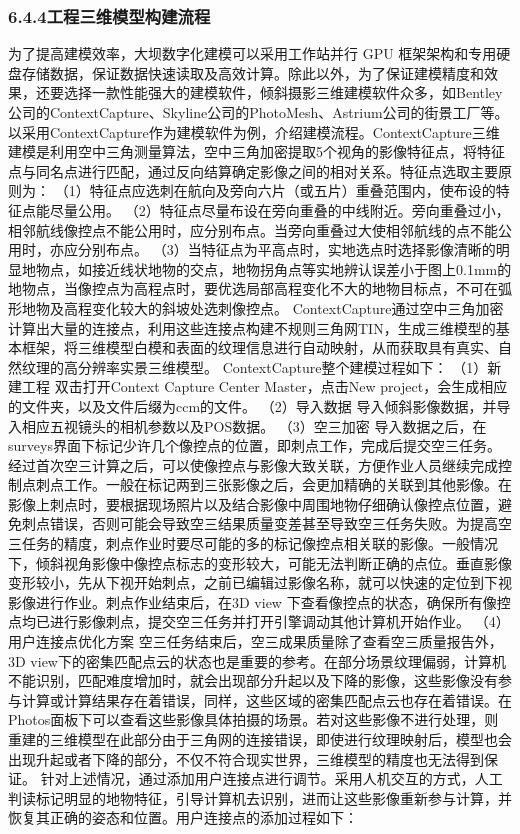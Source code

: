 \subsubsection{6.4.4工程三维模型构建流程}\label{ux5de5ux7a0bux4e09ux7ef4ux6a21ux578bux6784ux5efaux6d41ux7a0b} 为了提高建模效率，大坝数字化建模可以采用工作站并行 GPU 框架架构和专用硬盘存储数据，保证数据快速读取及高效计算。除此以外，为了保证建模精度和效果，还要选择一款性能强大的建模软件，倾斜摄影三维建模软件众多，如Bentley公司的ContextCapture、Skyline公司的PhotoMesh、Astrium公司的街景工厂等。 以采用ContextCapture作为建模软件为例，介绍建模流程。ContextCapture三维建模是利用空中三角测量算法，空中三角加密提取5个视角的影像特征点，将特征点与同名点进行匹配，通过反向结算确定影像之间的相对关系。特征点选取主要原则为： （1）特征点应选刺在航向及旁向六片（或五片）重叠范围内，使布设的特征点能尽量公用。 （2）特征点尽量布设在旁向重叠的中线附近。旁向重叠过小，相邻航线像控点不能公用时，应分别布点。当旁向重叠过大使相邻航线的点不能公用时，亦应分别布点。 （3）当特征点为平高点时，实地选点时选择影像清晰的明显地物点，如接近线状地物的交点，地物拐角点等实地辨认误差小于图上0.1mm的地物点，当像控点为高程点时，要优选局部高程变化不大的地物目标点，不可在弧形地物及高程变化较大的斜坡处选刺像控点。 ContextCapture通过空中三角加密计算出大量的连接点，利用这些连接点构建不规则三角网TIN，生成三维模型的基本框架，将三维模型白模和表面的纹理信息进行自动映射，从而获取具有真实、自然纹理的高分辨率实景三维模型。 ContextCapture整个建模过程如下： （1）新建工程 双击打开Context Capture Center Master，点击New project，会生成相应的文件夹，以及文件后缀为ccm的文件。 （2）导入数据 导入倾斜影像数据，并导入相应五视镜头的相机参数以及POS数据。 （3）空三加密 导入数据之后，在surveys界面下标记少许几个像控点的位置，即刺点工作，完成后提交空三任务。经过首次空三计算之后，可以使像控点与影像大致关联，方便作业人员继续完成控制点刺点工作。一般在标记两到三张影像之后，会更加精确的关联到其他影像。在影像上刺点时，要根据现场照片以及结合影像中周围地物仔细确认像控点位置，避免刺点错误，否则可能会导致空三结果质量变差甚至导致空三任务失败。为提高空三任务的精度，刺点作业时要尽可能的多的标记像控点相关联的影像。一般情况下，倾斜视角影像中像控点标志的变形较大，可能无法判断正确的点位。垂直影像变形较小，先从下视开始刺点，之前已编辑过影像名称，就可以快速的定位到下视影像进行作业。刺点作业结束后，在3D view 下查看像控点的状态，确保所有像控点均已进行影像刺点，提交空三任务并打开引擎调动其他计算机开始作业。 （4）用户连接点优化方案 空三任务结束后，空三成果质量除了查看空三质量报告外，3D view下的密集匹配点云的状态也是重要的参考。在部分场景纹理偏弱，计算机不能识别，匹配难度增加时，就会出现部分升起以及下降的影像，这些影像没有参与计算或计算结果存在着错误，同样，这些区域的密集匹配点云也存在着错误。在Photos面板下可以查看这些影像具体拍摄的场景。若对这些影像不进行处理，则重建的三维模型在此部分由于三角网的连接错误，即使进行纹理映射后，模型也会出现升起或者下降的部分，不仅不符合现实世界，三维模型的精度也无法得到保证。 针对上述情况，通过添加用户连接点进行调节。采用人机交互的方式，人工判读标记明显的地物特征，引导计算机去识别，进而让这些影像重新参与计算，并恢复其正确的姿态和位置。用户连接点的添加过程如下： 